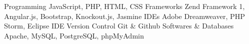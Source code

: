 \begin{cvskills}
  \cvskill
    {Programming}
    {JavaScript, PHP, HTML, CSS}
  \cvskill
  {Frameworks}
  {Zend Framework 1, Angular.js, Bootstrap, Knockout.js, Jasmine}  
  \cvskill
  {IDEs}
  {Adobe Dreamweaver, PHP Storm, Eclipse IDE}  
  \cvskill
  {Version Control}
  {Git \& Github}  
  \cvskill
  {Softwares \& Databases}
  {Apache, MySQL, PostgreSQL, phpMyAdmin}      
    
\end{cvskills}
